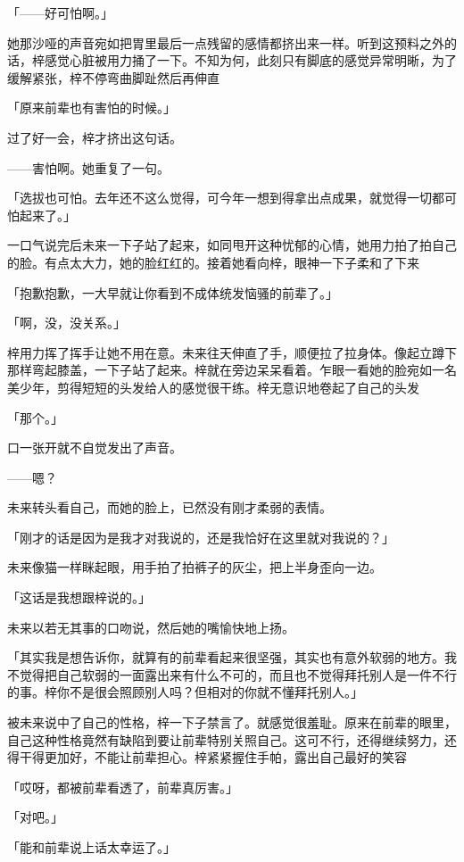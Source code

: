 \documentclass[UTF8]{ctexart}
\begin{document}
    「——好可怕啊。」

    她那沙哑的声音宛如把胃里最后一点残留的感情都挤出来一样。听到这预料之外的话，梓感觉心脏被用力捅了一下。不知为何，此刻只有脚底的感觉异常明晰，为了缓解紧张，梓不停弯曲脚趾然后再伸直

    「原来前辈也有害怕的时候。」

    过了好一会，梓才挤出这句话。

    ——害怕啊。她重复了一句。

    「选拔也可怕。去年还不这么觉得，可今年一想到得拿出点成果，就觉得一切都可怕起来了。」

    一口气说完后未来一下子站了起来，如同甩开这种忧郁的心情，她用力拍了拍自己的脸。有点太大力，她的脸红红的。接着她看向梓，眼神一下子柔和了下来

    「抱歉抱歉，一大早就让你看到不成体统发恼骚的前辈了。」

    「啊，没，没关系。」

    梓用力挥了挥手让她不用在意。未来往天伸直了手，顺便拉了拉身体。像起立蹲下那样弯起膝盖，一下子站了起来。梓就在旁边呆呆看着。乍眼一看她的脸宛如一名美少年，剪得短短的头发给人的感觉很干练。梓无意识地卷起了自己的头发

    「那个。」

    口一张开就不自觉发出了声音。

    ——嗯？

    未来转头看自己，而她的脸上，已然没有刚才柔弱的表情。

    「刚才的话是因为是我才对我说的，还是我恰好在这里就对我说的？」

    未来像猫一样眯起眼，用手拍了拍裤子的灰尘，把上半身歪向一边。

    「这话是我想跟梓说的。」

    未来以若无其事的口吻说，然后她的嘴愉快地上扬。

    「其实我是想告诉你，就算有的前辈看起来很坚强，其实也有意外软弱的地方。我不觉得把自己软弱的一面露出来有什么不可的，而且也不觉得拜托别人是一件不行的事。梓你不是很会照顾别人吗？但相对的你就不懂拜托别人。」

    被未来说中了自己的性格，梓一下子禁言了。就感觉很羞耻。原来在前辈的眼里，自己这种性格竟然有缺陷到要让前辈特别关照自己。这可不行，还得继续努力，还得干得更加好，不能让前辈担心。梓紧紧握住手帕，露出自己最好的笑容

    「哎呀，都被前辈看透了，前辈真厉害。」

    「对吧。」

    「能和前辈说上话太幸运了。」
\end{document}
